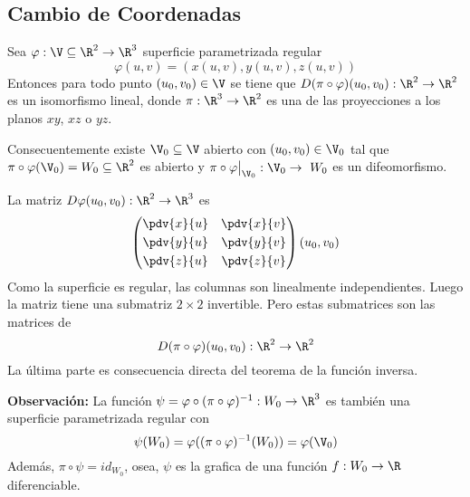 \documentclass{article}
\begin{document}
\subsection{Cambio de Coordenadas}
\begin{lema}
    Sea $\varphi:\V\subseteq\R^{2}\to\R^{3}$ superficie parametrizada regular
    \begin{equation*}
        \varphi(u,v)=(x(u,v),y(u,v),z(u,v))
    \end{equation*}
    Entonces para todo punto $(u_{0},v_{0})\in\V$ se tiene que $D(\pi\circ\varphi)(u_{0},v_{0}):
    \R^{2}\to\R^{2}$ es un isomorfismo lineal, donde $\pi:\R^{3}\to\R^{2}$ es una de las 
    proyecciones a los planos $xy$, $xz$ o $yz$.
    \vspace{4mm}

    \noindent Consecuentemente existe $\V_{0}\subseteq\V$ abierto con $(u_{0},v_{0})\in\V_{0}$ tal
    que $\pi\circ\varphi(\V_{0})=W_{0}\subseteq\R^{2}$ es abierto y $\pi\circ\varphi\big|_{\V_{0}}
    :\V_{0}\to\ W_{0}$ es un difeomorfismo.
\end{lema}

\begin{dem}
    La matriz $D\varphi(u_{0},v_{0}):\R^{2}\to\R^{3}$ es
    \begin{equation*}
        \begin{pmatrix}
            \pdv{x}{u} & \pdv{x}{v} \\[1mm]
            \pdv{y}{u} & \pdv{y}{v} \\[1mm]
            \pdv{z}{u} & \pdv{z}{v}
        \end{pmatrix}(u_{0},v_{0})
    \end{equation*}
    Como la superficie es regular, las columnas son linealmente independientes. Luego la matriz 
    tiene una submatriz $2\times2$ invertible. Pero estas submatrices son las matrices de
    \begin{equation*}
        D(\pi\circ\varphi)(u_{0},v_{0}):\R^{2}\to\R^{2}
    \end{equation*}
    La última parte es consecuencia directa del teorema de la función inversa.
\end{dem}

\noindent\textbf{Observación:} La función $\psi=\varphi\circ(\pi\circ\varphi)^{-1}:W_{0}\to\R^{3}$
es también una superficie parametrizada regular con
\begin{equation*}
    \psi(W_{0})=\varphi((\pi\circ\varphi)^{-1}(W_{0}))=\varphi(\V_{0})
\end{equation*}
Además, $\pi\circ\psi=id_{W_{0}}$, osea, $\psi$ es la grafica de una función $f:W_{0}\to\R$ 
diferenciable.
\end{document}
